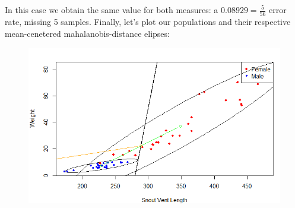 \documentclass[11pt,a4paper]{article}
\begin{document}
	In this case we obtain the same value for both measures: a $0.08929 = \frac{5}{56}$ error rate, missing 5 samples. Finally, let's plot our populations and their respective mean-cenetered mahalanobis-distance elipses:
	
	\begin{figure}[H] 
		\centering
		\includegraphics[scale=.9]{./pics/LDA}
	\end{figure}
	
	
\end{document}
